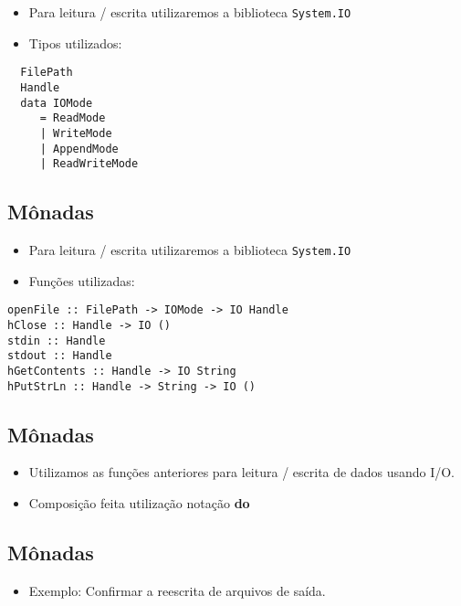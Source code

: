 \documentclass[11pt]{article}
\begin{document}
\begin{itemize}
\item Para leitura / escrita utilizaremos a biblioteca \texttt{System.IO}

\item Tipos utilizados:
\end{itemize}

\begin{verbatim}
  FilePath
  Handle
  data IOMode
     = ReadMode
     | WriteMode
     | AppendMode
     | ReadWriteMode
\end{verbatim}
\subsection*{Mônadas}
\label{sec:orgf70ee6d}

\begin{itemize}
\item Para leitura / escrita utilizaremos a biblioteca \texttt{System.IO}

\item Funções utilizadas:
\end{itemize}

\begin{verbatim}
openFile :: FilePath -> IOMode -> IO Handle
hClose :: Handle -> IO ()
stdin :: Handle
stdout :: Handle
hGetContents :: Handle -> IO String
hPutStrLn :: Handle -> String -> IO () 
\end{verbatim}
\subsection*{Mônadas}
\label{sec:orgb0964bc}

\begin{itemize}
\item Utilizamos as funções anteriores para leitura / escrita de dados usando I/O.

\item Composição feita utilização notação \textbf{do}
\end{itemize}
\subsection*{Mônadas}
\label{sec:org0013c91}

\begin{itemize}
\item Exemplo: Confirmar a reescrita de arquivos de saída.
\end{itemize}
\end{document}

